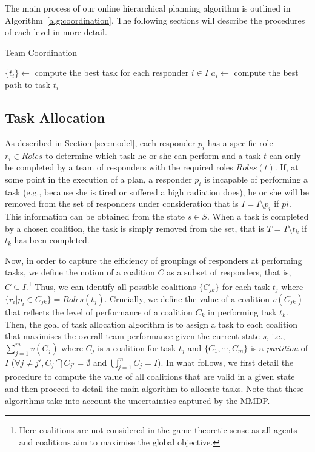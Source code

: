 The main process of our online hierarchical planning algorithm is
outlined in Algorithm~\ref{alg:coordination}. The following
sections will describe the procedures of each level in more detail.

\begin{algorithm}[t]
  \caption{Team Coordination}\small
  \label{alg:coordination}
  \Indm
  \Indp\BlankLine
  $\{ t_i \} \gets$ compute the best task for each responder $i\in I$ \;
   {
    $a_i \gets$ compute the best path to task $t_i$ \;
  }
  \vspace{-1mm}

\end{algorithm}

\subsection{Task Allocation}
\label{sec:taskplanning}

\noindent As described in Section \ref{sec:model}, each responder
$p_i$ has a specific role $r_i \in Roles$ to determine which task
he or she can perform and  a task $t$ can only be completed by a
team of responders with the required roles $Roles(t)$. If, at some
point in the execution of a plan, a responder $p_i$ is incapable of
performing a task (e.g., because she is tired or suffered a high
radiation does), he or she will be removed from the set of
responders under consideration that is $I = I \setminus p_i$ if
$pi$. This information can be obtained from the state $s \in S$.
When a task is completed by a chosen coalition, the task is simply
removed from the set, that is $T = T\setminus t_k$ if $t_k$ has
been completed.

Now, in order to capture the efficiency of groupings of responders
at performing tasks, we define the notion of a coalition $C$ as a
subset of responders, that is, $C \subseteq I$.\footnote{Here
coalitions are not considered in the game-theoretic sense as all
agents and coalitions aim to maximise the global objective.} Thus,
we can identify all possible coalitions $\{ C_{jk} \}$ for each
task $t_j$ where $\{r_i | p_i \in C_{jk}\} = Roles(t_j)$.
Crucially, we define the value of a coalition $v(C_{jk})$ that
reflects the level of performance of a coalition $C_k$ in
performing task $t_k$.  Then, the goal of task allocation algorithm
is to assign a task to each coalition that maximises the overall
team performance given the current state $s$, i.e., $\sum_{j=1}^m
v(C_j)$ where $C_j$ is a coalition for task $t_j$ and $\{ C_1,
\cdots, C_m \}$ is a {\em partition} of $I$ ($\forall j\neq j', C_j
\bigcap C_{j'} = \emptyset$ and $\bigcup_{j=1}^m C_j=I$). In what
follows, we first detail the procedure to compute the value of all
coalitions that are valid in a given state and then proceed to
detail the main algorithm to allocate tasks. Note that these
algorithms take into account the uncertainties captured by the
MMDP.


